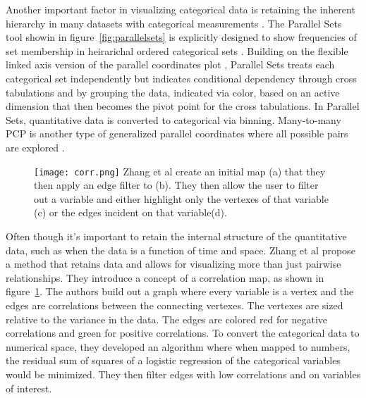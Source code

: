 \documentclass[../main.text]{subfiles}
\begin{document}
Another important factor in visualizing categorical data is retaining the
inherent hierarchy in many datasets with categorical measurements
\cite{shneiderman_visualizing_2000}. The Parallel Sets tool
showin in figure~\ref{fig:parallelsets} is explicitly designed to show frequencies
of set membership in heirarichal ordered categorical sets \cite{kosara_parallel_2006}. Building on the flexible linked axis version of
  the parallel coordinates plot \cite{claessen_flexible_2011}, Parallel Sets
  treats each categorical set independently but indicates conditional
  dependency through cross tabulations and by grouping the data, indicated via
  color, based on an active dimension that then becomes the pivot point for the
  cross tabulations. In Parallel Sets, quantitative data is converted to
  categorical via binning. Many-to-many PCP is another type of generalized
  parallel coordinates where all possible pairs are explored \cite{lind_many--many_2009}. 

\begin{figure}
  \texttt{[image: corr.png]}
  \label{caption} Zhang et al create an initial map (a) that they then apply an
  edge filter to (b). They then allow the user to filter out a variable and
  either highlight only the vertexes of that variable (c) or the edges incident
  on that variable(d).
  \label{fig:corr}
\end{figure}

Often though it's important to retain the internal structure of the
quantitative data, such as when the data is a function of time and
space. Zhang et al propose a method that retains data and allows for
visualizing more than just pairwise relationships\cite{zhang_visual_2015}. They
introduce a concept of a correlation map, as shown in
figure~\ref{fig:corr}. The authors build out a graph where every variable is a
vertex and the edges are correlations between the connecting vertexes. The
vertexes are sized relative to the variance in the data. The edges are colored
red for negative correlations and green for positive correlations. To convert
the categorical data to numerical space, they developed an algorithm where when
mapped to numbers, the residual sum of squares of a logistic regression of the
categorical variables  would be minimized. They then filter edges with low
correlations and on variables of interest.
\end{document}
